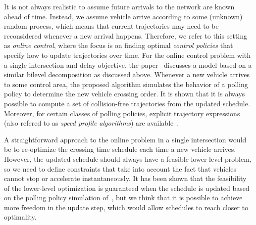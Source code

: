 \documentclass[a4paper]{article}
\theoremstyle{definition}
\theoremstyle{plain}
\begin{document}

It is not always realistic to assume future arrivals to the network are known
ahead of time. Instead, we assume vehicle arrive according to some (unknown)
random process, which means that current trajectories may need to be
reconsidered whenever a new arrival happens. Therefore, we refer to this setting
as \textit{online control}, where the focus is on finding optimal \textit{control policies} that
specify how to update trajectories over time.
%
For the online control problem with a single intersection and delay objective,
the paper~\cite{miculescuPollingsystemsbasedAutonomousVehicle2016} discusses a
model based on a similar bilevel decomposition as discussed above. Whenever a
new vehicle arrives to some control area, the proposed algorithm simulates the
behavior of a polling policy to determine the new vehicle crossing order. It is
shown that it is always possible to compute a set of collision-free trajectories
from the updated schedule. Moreover, for certain classes of polling policies,
explicit trajectory expressions (also refered to as \textit{speed profile
  algorithms}) are available~\cite{timmermanPlatoonFormingAlgorithms2021}.


A straightforward approach to the online problem in a single intersection would
be to re-optimize the crossing time schedule each time a new vehicle arrives.
However, the updated schedule should always have a feasible lower-level problem,
so we need to define constraints that take into account the fact that vehicles
cannot stop or accelerate instantaneously. It has been shown that the
feasibility of the lower-level optimization is guaranteed when the schedule is
updated based on the polling policy simulation
of~\cite{miculescuPollingsystemsbasedAutonomousVehicle2016}, but we think that
it is possible to achieve more freedom in the update step, which would allow
schedules to reach closer to optimality.




\end{document}
